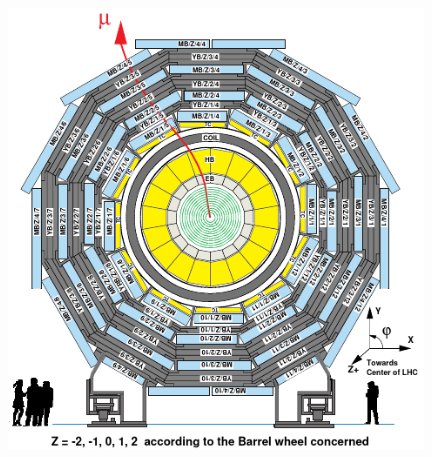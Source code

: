 \begin{figure}[p]
\centering
\includegraphics[width=0.98\textwidth]{CMS/CMSTRANS.png}
\label{CMS2}
\end{figure}

